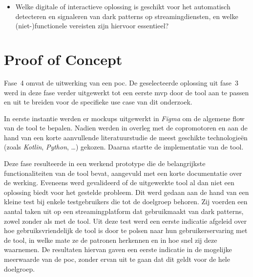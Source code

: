 \begin{itemize}
    \item Welke digitale of interactieve oplossing is geschikt voor het automatisch detecteren en signaleren van dark patterns op streamingdiensten, en welke (niet-)functionele vereisten zijn hiervoor essentieel?
\end{itemize}

\section{Proof of Concept}
\label{sec:poc}

\vspace{1em}

Fase~4 omvat de uitwerking van een \acrlong{poc}. De geselecteerde oplossing uit fase~3 werd in deze fase verder uitgewerkt tot een eerste \acrlong{mvp} door de tool aan te passen en uit te breiden voor de specifieke use case van dit onderzoek.

\vspace{1em}

In eerste instantie werden er mockups uitgewerkt in \emph{Figma} om de algemene flow van de tool te bepalen. Nadien werden in overleg met de copromotoren en aan de hand van een korte aanvullende literatuurstudie de meest geschikte technologieën (zoals \emph{Kotlin}, \emph{Python}, \ldots) gekozen. Daarna startte de implementatie van de tool.

\vspace{1em}

Deze fase resulteerde in een werkend prototype die de belangrijkste functionaliteiten van de tool bevat, aangevuld met een korte documentatie over de werking. Eveneens werd gevalideerd of de uitgewerkte tool al dan niet een oplossing biedt voor het gestelde probleem. Dit werd gedaan aan de hand van een kleine test bij enkele testgebruikers die tot de doelgroep behoren. Zij voerden een aantal taken uit op een streamingplatform dat gebruikmaakt van dark patterns, zowel zonder als met de tool. Uit deze test werd een eerste indicatie afgeleid over hoe gebruiksvriendelijk de tool is door te polsen naar hun gebruikerservaring met de tool, in welke mate ze de patronen herkennen en in hoe snel zij deze waarnemen. De resultaten hiervan gaven een eerste indicatie in de mogelijke meerwaarde van de \acrshort{poc}, zonder ervan uit te gaan dat dit geldt voor de hele doelgroep.

\vspace{1em}

